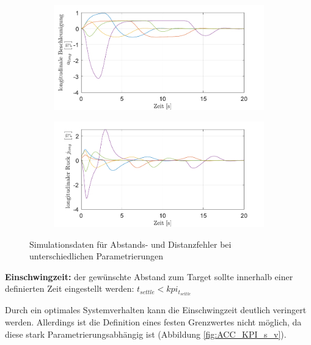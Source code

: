 \begin{figure}[ht]
    \centering
    \begin{subfigure}[b]{.49\textwidth}
        \centering
        \includegraphics[width=\textwidth]{figures/3_Implementierung/ACC_Vel_Const/ACC_Vel_Const_a-Long.pdf}
    \end{subfigure}
    \hfill
    \begin{subfigure}[b]{.49\textwidth}
        \centering
        \includegraphics[width=\textwidth]{figures/3_Implementierung/ACC_Vel_Const/ACC_Vel_Const_j-Long.pdf}
    \end{subfigure}
    \caption{Simulationsdaten für Abstands- und Distanzfehler bei unterschiedlichen Parametrierungen}
    \label{fig:ACC_KPI_a_j}
\end{figure}

\medskip\noindent\textbf{Einschwingzeit:} der gewünschte Abstand zum Target sollte innerhalb einer definierten Zeit eingestellt werden: $t_{settle} < kpi_{t_{settle}}$

\noindent Durch ein optimales Systemverhalten kann die Einschwingzeit deutlich veringert werden. Allerdings ist die Definition eines festen Grenzwertes nicht möglich, da diese stark Parametrierungsabhängig ist (Abbildung \ref{fig:ACC_KPI_s_v}). 

